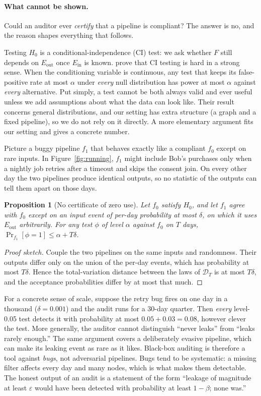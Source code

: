 \documentclass[10pt,twocolumn,letterpaper]{article}
\newtheorem{proposition}{Proposition}
\theoremstyle{definition}
\newcommand{\Ein}{E_{\mathrm{in}}}
\newcommand{\Eout}{E_{\mathrm{out}}}
\begin{document}
\paragraph{What cannot be shown.}
Could an auditor ever \emph{certify} that a pipeline is compliant? The answer
is no, and the reason shapes everything that follows.

Testing $H_0$ is a conditional-independence (CI) test: we ask whether $F$
still depends on $\Eout$ once $\Ein$ is known. \citet{shah2020hardness} prove
that CI testing is hard in a strong sense. When the conditioning variable is
continuous, any test that keeps its false-positive rate at most $\alpha$ under
\emph{every} null distribution has power at most $\alpha$ against \emph{every}
alternative. Put simply, a test cannot be both always valid and ever useful
unless we add assumptions about what the data can look like. Their result
concerns general distributions, and our setting has extra structure (a graph
and a fixed pipeline), so we do not rely on it directly. A more elementary
argument fits our setting and gives a concrete number.

Picture a buggy pipeline $f_1$ that behaves exactly like a compliant $f_0$
except on rare inputs. In Figure~\ref{fig:running}, $f_1$ might include
Bob's purchases only when a nightly job retries after a timeout and skips the
consent join. On every other day the two pipelines produce identical outputs,
so no statistic of the outputs can tell them apart on those days.

\begin{proposition}[No certificate of zero use]\label{prop:imposs}
Let $f_0$ satisfy $H_0$, and let $f_1$ agree with $f_0$ except on an input event of
per-day probability at most $\delta$, on which it uses $\Eout$ arbitrarily. For any
test $\phi$ of level $\alpha$ against $f_0$ on $T$ days,
$\Pr_{f_1}[\phi=1]\le \alpha+T\delta$.
\end{proposition}
\begin{proof}[Proof sketch]
Couple the two pipelines on the same inputs and randomness. Their outputs
differ only on the union of the per-day events, which has probability at most
$T\delta$. Hence the total-variation distance between the laws of
$\mathcal{D}_T$ is at most $T\delta$, and the acceptance probabilities differ by at most
that much.
\end{proof}
For a concrete sense of scale, suppose the retry bug fires on one day in a
thousand ($\delta=0.001$) and the audit runs for a 30-day quarter. Then
\emph{every} level-0.05 test detects it with probability at most
$0.05+0.03=0.08$, however clever the test. More generally, the auditor cannot
distinguish ``never leaks'' from ``leaks rarely enough.'' The same argument
covers a deliberately evasive pipeline, which can make its leaking event as
rare as it likes. Black-box auditing is therefore a tool against \emph{bugs},
not adversarial pipelines. Bugs tend to be systematic: a missing filter
affects every day and many nodes, which is what makes them detectable. The
honest output of an audit is a statement of the form ``leakage of magnitude
at least $\varepsilon$ would have been detected with probability at least
$1-\beta$; none was.''
\end{document}
